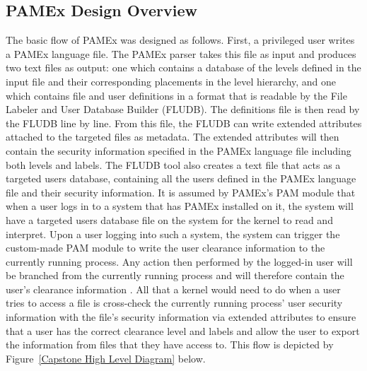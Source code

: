 \subsection{PAMEx Design Overview} 
\par 
\vspace{\baselineskip}
\hspace{1em}
The basic flow of PAMEx was designed as follows. First, a 
privileged user writes a PAMEx language file. The PAMEx parser takes 
this file as input and produces two text files as output: one which 
contains a database of the levels defined in the input file and their 
corresponding placements in the level hierarchy, and one which contains 
file and user definitions in a format that is readable by the File 
Labeler and User Database Builder (FLUDB). The definitions file is then 
read by the FLUDB line by line. From this file, the FLUDB can write 
extended attributes attached to the targeted files as metadata. The 
extended attributes will then contain the security information 
specified in the PAMEx language file including both levels and labels. 
The FLUDB tool also creates a text file that acts as a targeted users 
database, containing all the users defined in the PAMEx language file 
and their security information. It is assumed by PAMEx's PAM module that when a user logs in 
to a system that has PAMEx installed on it, the system will have a 
targeted users database file on the system for the kernel to read and 
interpret. Upon a user logging into such a system, the system can 
trigger the custom-made PAM module to write the user clearance 
information to the currently running process. Any action then 
performed by the logged-in user will be branched from the currently 
running process and will therefore contain the user’s clearance 
information \cite{linuxpam}. All that a kernel would need to do when a user tries to 
access a file is cross-check the currently running process’ user 
security information with the file’s security information via extended 
attributes to ensure that a user has the correct clearance level and 
labels and allow the user to export the information from files that 
they have access to. This flow is depicted by Figure~\ref{Capstone High Level Diagram} below.
\clearpage

